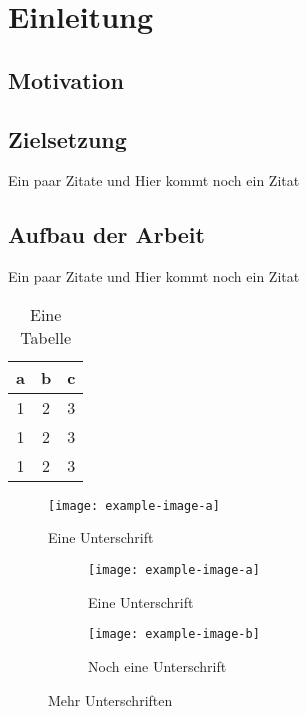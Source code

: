 \chapter{Einleitung}
\label{ch:intro}

\blindtext

\section{Motivation}
\blindtext

\section{Zielsetzung}
Ein paar Zitate \cite{Hartley2004} und \cite{Bishop2006} Hier kommt noch ein Zitat 
\cite{DorrChristopherH.2015SSBo}
\blindmathpaper
\section{Aufbau der Arbeit}

Ein paar Zitate \cite{Hartley2004} und \cite{Bishop2006} Hier kommt noch ein Zitat 
\cite{DorrChristopherH.2015SSBo}

\begin{table}[ht]
	\centering
	\begin{tabular}{c|c|c}
		a & b & c \\ \hline
		1 & 2 & 3 \\
		1 & 2 & 3 \\
		1 & 2 & 3
	\end{tabular}
	\caption{Eine Tabelle}
\end{table}

\begin{figure}[ht]
	\centering
	\texttt{[image: example-image-a]}
	\caption{Eine Unterschrift}
\end{figure}

\begin{figure}[ht]
	\centering
	\begin{subfigure}[b]{0.45\textwidth}
		\texttt{[image: example-image-a]}
		\caption{Eine Unterschrift}
	\end{subfigure} \hfill
	\begin{subfigure}[b]{0.45\textwidth}
		\texttt{[image: example-image-b]}
		\caption{Noch eine Unterschrift}
	\end{subfigure}
	\caption{Mehr Unterschriften}
\end{figure}



